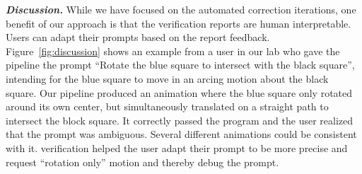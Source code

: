 

\vspace{0.5em}
\noindent
{\bf \em Discussion.}
While we have focused on the automated correction iterations, one
benefit of our approach is that the verification reports are human
interpretable. Users can adapt their prompts
based on the report feedback. 
%
Figure~\ref{fig:discussion} shows an example from a user in our lab who gave the
pipeline the prompt ``Rotate the blue square to intersect with the
black square'', intending for the blue square to move in an arcing motion
about the black square.
%
Our pipeline produced an animation where the blue
square only rotated around its own center, but simultaneously
translated on a straight path to intersect the block square.
%
It correctly passed the \dslname{} program and the user
realized that the prompt was ambiguous. Several different
animations could be consistent with it.
%
\dslname{} verification helped the user adapt their prompt to be more
precise and request ``rotation only'' motion and thereby debug the prompt.

    


